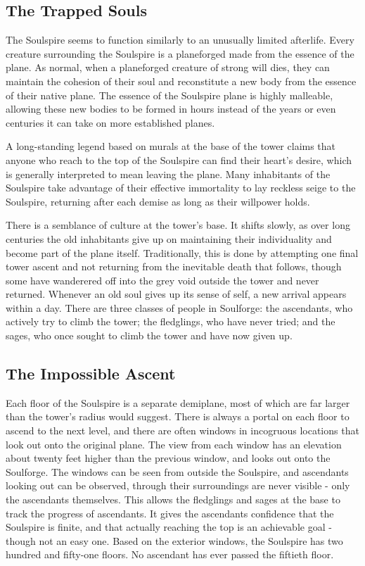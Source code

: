     \subsection{The Trapped Souls}
        The Soulspire seems to function similarly to an unusually limited afterlife.
        Every creature surrounding the Soulspire is a planeforged made from the essence of the plane.
        As normal, when a planeforged creature of strong will dies, they can maintain the cohesion of their soul and reconstitute a new body from the essence of their native plane.
        The essence of the Soulspire plane is highly malleable, allowing these new bodies to be formed in hours instead of the years or even centuries it can take on more established planes.

        A long-standing legend based on murals at the base of the tower claims that anyone who reach to the top of the Soulspire can find their heart's desire, which is generally interpreted to mean leaving the plane.
        Many inhabitants of the Soulspire take advantage of their effective immortality to lay reckless seige to the Soulspire, returning after each demise as long as their willpower holds.

        There is a semblance of culture at the tower's base.
        It shifts slowly, as over long centuries the old inhabitants give up on maintaining their individuality and become part of the plane itself.
        Traditionally, this is done by attempting one final tower ascent and not returning from the inevitable death that follows, though some have wanderered off into the grey void outside the tower and never returned.
        Whenever an old soul gives up its sense of self, a new arrival appears within a day.
        There are three classes of people in Soulforge: the ascendants, who actively try to climb the tower; the fledglings, who have never tried; and the sages, who once sought to climb the tower and have now given up.

    \subsection{The Impossible Ascent}
        Each floor of the Soulspire is a separate demiplane, most of which are far larger than the tower's radius would suggest.
        There is always a portal on each floor to ascend to the next level, and there are often windows in incogruous locations that look out onto the original plane.
        The view from each window has an elevation about twenty feet higher than the previous window, and looks out onto the Soulforge.
        The windows can be seen from outside the Soulspire, and ascendants looking out can be observed, through their surroundings are never visible - only the ascendants themselves.
        This allows the fledglings and sages at the base to track the progress of ascendants.
        It gives the ascendants confidence that the Soulspire is finite, and that actually reaching the top is an achievable goal - though not an easy one.
        Based on the exterior windows, the Soulspire has two hundred and fifty-one floors.
        No ascendant has ever passed the fiftieth floor.

